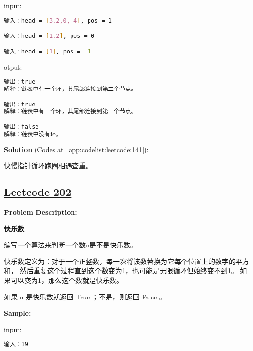 input:\par

\begin{lstlisting}[language=bash]
输入：head = [3,2,0,-4], pos = 1

输入：head = [1,2], pos = 0

输入：head = [1], pos = -1
\end{lstlisting}

otput:\par

\begin{lstlisting}[language=bash]
输出：true
解释：链表中有一个环，其尾部连接到第二个节点。

输出：true
解释：链表中有一个环，其尾部连接到第一个节点。

输出：false
解释：链表中没有环。
\end{lstlisting}

\textbf{Solution }(Codes at~\ref{app:codelist:leetcode:141}):\par

快慢指针循环跑圈相遇查重。\par



\subsection{\href{https://leetcode-cn.com/}{Leetcode 202}}\label{app:problemlist:leetcode:202}

\textbf{Problem Description:}\par

\textbf{快乐数}\par

编写一个算法来判断一个数n是不是快乐数。\par

快乐数定义为：对于一个正整数，每一次将该数替换为它每个位置上的数字的平方和，
然后重复这个过程直到这个数变为1，也可能是无限循环但始终变不到1。
如果可以变为1，那么这个数就是快乐数。\par

如果 n 是快乐数就返回 True ；不是，则返回 False 。\par


\textbf{Sample:}\par

input:\par

\begin{lstlisting}[language=bash]
输入：19
\end{lstlisting}

